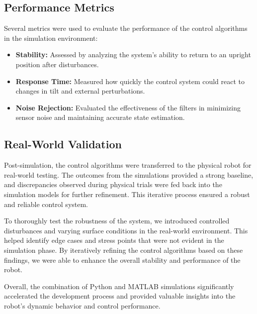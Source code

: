 \subsection{Performance Metrics}
Several metrics were used to evaluate the performance of the control algorithms in the simulation environment:

\begin{itemize}
\item \textbf{Stability:} Assessed by analyzing the system's ability to return to an upright position after disturbances.
\item \textbf{Response Time:} Measured how quickly the control system could react to changes in tilt and external perturbations.
\item \textbf{Noise Rejection:} Evaluated the effectiveness of the filters in minimizing sensor noise and maintaining accurate state estimation.
\end{itemize}

\subsection{Real-World Validation}
Post-simulation, the control algorithms were transferred to the physical robot for real-world testing. The outcomes from the simulations provided a strong baseline, and discrepancies observed during physical trials were fed back into the simulation models for further refinement. This iterative process ensured a robust and reliable control system.


To thoroughly test the robustness of the system, we introduced controlled disturbances and varying surface conditions in the real-world environment. This helped identify edge cases and stress points that were not evident in the simulation phase. By iteratively refining the control algorithms based on these findings, we were able to enhance the overall stability and performance of the robot.

Overall, the combination of Python and MATLAB simulations significantly accelerated the development process and provided valuable insights into the robot's dynamic behavior and control performance.

